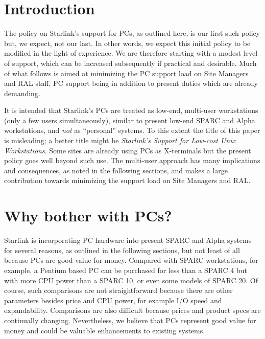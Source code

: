 \stardocabstract
 \begin{latexonly}
   \setlength{\parskip}{0mm}
   \tableofcontents
   \setlength{\parskip}{\medskipamount}
   \markright{\stardocname}
 \end{latexonly}
\newpage
\renewcommand{\thepage}{\arabic{page}}
\setcounter{page}{1}

\section{Introduction}

The policy on Starlink's support for PCs, as outlined here, is our first
such policy but, we expect, not our last.  In other words, we expect
this initial policy to be modified in the light of experience.   We
are therefore starting with a modest level of support, which can be
increased subsequently if practical and desirable. Much of what
follows is aimed at minimizing the PC support load on Site Managers and
RAL staff, PC support being in addition to present duties which are
already demanding.

It is intended that Starlink's PCs are treated as low-end, multi-user
workstations (only a few users simultaneously), similar to present
low-end SPARC and Alpha workstations, and {\em not} as ``personal''
systems.  To this extent the title of this paper is misleading; a
better title might be {\em Starlink's Support for Low-cost Unix
Workstations}.  Some sites are already using PCs as X-terminals but the
present policy goes well beyond such use.  The multi-user approach has
many implications and consequences, as noted in the following sections,
and makes a large contribution towards minimizing the support load on
Site Managers and RAL.

\section{Why bother with PCs?}

Starlink is incorporating PC hardware into present SPARC and Alpha
systems for several reasons, as outlined in the following sections, but
not least of all because PCs are good value for money.   Compared with
SPARC workstations, for example, a Pentium based PC can be purchased
for less than a SPARC 4 but with more CPU power than a SPARC 10, or
even some models of SPARC 20.  Of course, such comparisons are not
straightforward because there are other parameters besides price and
CPU power, for example I/O speed and expandability.  Comparisons are
also difficult because prices and product specs are continually
changing.  Nevertheless, we believe that PCs represent good value for
money and could be valuable enhancements to existing systems.   


